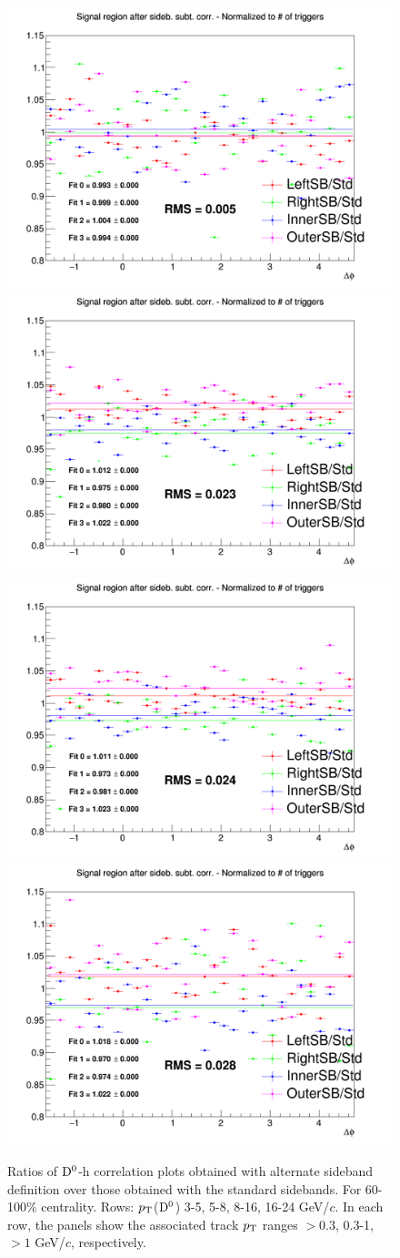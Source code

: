 \begin{figure}
{\includegraphics[width=0.31\linewidth]{figuresVsCent/Dzero/SystSideb/60100/Ratio_AzimCorrDistr_Dzero_Canvas_PtIntBins6to8_PoolInt_thr1to99.png}} \\
{\includegraphics[width=0.31\linewidth]{figuresVsCent/Dzero/SystSideb/60100/Ratio_AzimCorrDistr_Dzero_Canvas_PtIntBins9to11_PoolInt_thr03to99.png}}
{\includegraphics[width=0.31\linewidth]{figuresVsCent/Dzero/SystSideb/60100/Ratio_AzimCorrDistr_Dzero_Canvas_PtIntBins9to11_PoolInt_thr03to1.png}}
{\includegraphics[width=0.31\linewidth]{figuresVsCent/Dzero/SystSideb/60100/Ratio_AzimCorrDistr_Dzero_Canvas_PtIntBins9to11_PoolInt_thr1to99.png}}  \\
 \caption{Ratios of ${\rm D^0}$-h correlation plots obtained with alternate sideband definition over those obtained with the standard sidebands. For 60-100\% centrality. Rows: $p_{\rm T}$(${\rm D^0}$) 3-5, 5-8, 8-16, 16-24 GeV/$c$. In each row, the panels show the associated track $p_{\rm T}$ ranges $> 0.3$, 0.3-1, $> 1$ GeV/$c$, respectively.}
\label{fig:SysBkg60100}
\end{figure}




